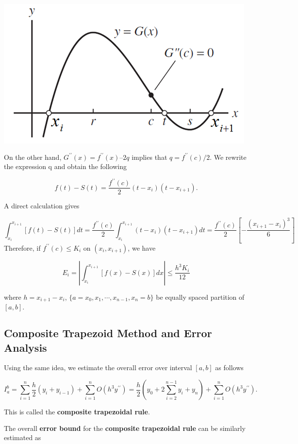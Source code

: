 \documentclass[
]{book}
\begin{document}
\begin{center}\includegraphics[width=0.45\linewidth]{img12/w12-TrapezoidErrorBound} \end{center}

On the other hand, \(G^{\prime\prime}(x) = f^{\prime\prime}(x) – 2q\) implies that \(q = f^{\prime\prime}(c)/2\). We rewrite the expression q and obtain the following

\[
f(t) - S(t) = \frac{f^{\prime\prime}(c)}{2}(t-x_i)(t-x_{i+1}).
\]

A direct calculation gives

\[
\int_{x_i}^{x_{i+1}}[f(t) - S(t)] dt = \frac{f^{\prime\prime}(c)}{2}\int_{x_i}^{x_{i+1}}(t-x_i)(t-x_{i+1})dt =  \frac{f^{\prime\prime}(c)}{2}\left[-\frac{(x_{i+1}-x_i)^3}{6} \right]
\]
Therefore, if \(f^{\prime\prime}(c) \le K_i\) on \((x_i, x_{i+1})\), we have

\[
E_i = \left|\int_{x_i}^{x_{i+1}}\left[f(x) -  S(x)\right]dx \right| \le \frac{h^3K_i}{12}
\]

where \(h = x_{i+1} - x_i\), \(\{a = x_0, x_1, \cdots, x_{n-1}, x_n = b \}\) be equally spaced partition of \([a, b]\).

\hfill\break

\hypertarget{composite-trapezoid-method-and-error-analysis}{%
\subsection{Composite Trapezoid Method and Error Analysis}\label{composite-trapezoid-method-and-error-analysis}}

Using the same idea, we estimate the overall error over interval \([a, b]\) as follows

\[
I_a^b = \sum_{i=1}^n\frac{h}{2}(y_i + y_{i-1}) + \sum_{i = 1}^nO(h^3 y^{\prime\prime}) = \frac{h}{2} \left( y_0 + 2\sum_{i=2}^{n-1} y_i + y_n\right) + \sum_{i = 1}^nO(h^3 y^{\prime\prime}).
\]

This is called the \textbf{composite trapezoidal rule}.

The overall \textbf{error bound} for the \textbf{composite trapezoidal rule} can be similarly estimated as
\end{document}
